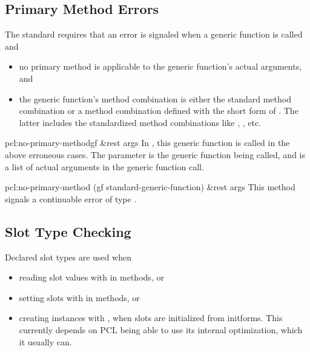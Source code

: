\subsection{Primary Method Errors}

The standard requires that an error is signaled when a generic
function is called and

\begin{itemize}
\item no primary method is applicable to the generic function's actual
  arguments, and
\item the generic function's method combination is either the standard
  method combination or a method combination defined with the short
  form of .  The latter includes the
  standardized method combinations like , , etc.
\end{itemize}

\begin{defgeneric}{pcl:}{no-primary-method}{gf \&rest args}
  In \cmucl, this generic function is called in the above erroneous
  cases.  The parameter  is the generic function being
  called, and  is a list of actual arguments in the generic
  function call.
\end{defgeneric}

\begin{defmethod}{pcl:}{no-primary-method}{%
    (gf standard-generic-function) \&rest args}
  This method signals a continuable error of type
  .
\end{defmethod}


\subsection{Slot Type Checking}

Declared slot types are used when 

\begin{itemize}
\item reading slot values with  in methods, or

\item setting slots with  in methods, or 
  
\item creating instances with , when slots are
  initialized from initforms.  This currently depends on PCL being
  able to use its internal  optimization, which it
  usually can.
\end{itemize}

